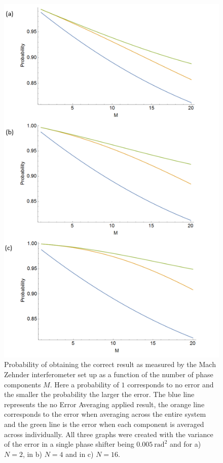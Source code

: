 \documentclass[aps,pra,twocolumn,superscriptaddress,numerical]{revtex4-1}
\begin{document}
		\begin{figure}
			\begin{centering}
				\includegraphics[width=\columnwidth]{Error_all.png}
				\par\end{centering}
			
			\caption[Error as measured by the Mach Zehnder interferometer set up as a function of the number of phase components. ]{Probability of obtaining the correct result as measured by the Mach Zehnder interferometer set up as a function of the number of phase components $M$. Here a probability of $1$ corresponds to no error and the smaller the probability the larger the error. The blue line represents the no Error Averaging applied result, the orange line corresponds to the error when averaging across the entire system and the green line is the error when each component is averaged across individually. All three graphs were created with the variance of the error in a single phase shifter being $0.005\ \textrm{rad}^{2}$ and for a) $N=2$, in b) $N=4$ and in c) $N=16$. \label{fig:Error-as-measured all}}
		\end{figure}
		
\end{document}
